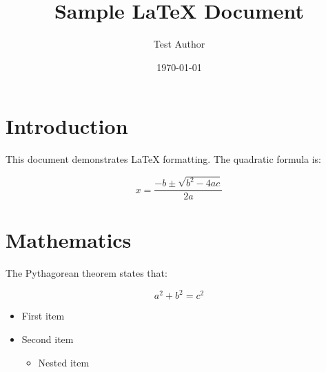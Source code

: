 \documentclass{article}
\title{Sample LaTeX Document}
\author{Test Author}
\date{\today}
\begin{document}
\maketitle

\section{Introduction}

This document demonstrates LaTeX formatting. The quadratic formula is:

\begin{equation}
  x = \frac{-b \pm \sqrt{b^2 - 4ac}}{2a}
\end{equation}

\section{Mathematics}

The Pythagorean theorem states that:

\begin{equation*}
  a^2 + b^2 = c^2
\end{equation*}

\begin{itemize}
  \item First item
  \item Second item
  \begin{itemize}
    \item Nested item
  \end{itemize}
\end{itemize}
\end{document}
